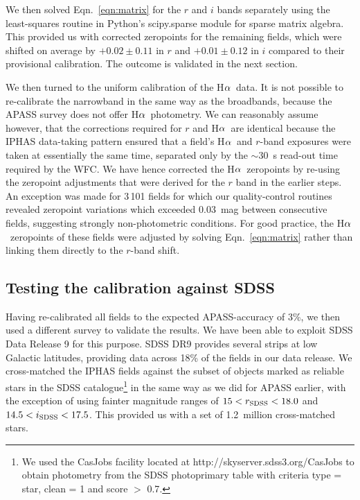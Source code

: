 \documentclass[useAMS,usenatbib]{mn2e}
\def\ha{\mbox{H$\rm \alpha$}}
\begin{document}
We then solved Eqn.~\ref{eqn:matrix} for the $r$ and $i$ bands
separately using the least-squares routine 
in Python's {\sc scipy.sparse} module for sparse matrix algebra.
This provided us with corrected zeropoints for the remaining fields,
which were shifted on average by $+0.02\pm0.11$ in $r$ 
and $+0.01\pm0.12$ in $i$ compared to their provisional calibration.
The outcome is validated in the next section.

We then turned to the uniform calibration of the \ha\ data.
It is not possible to re-calibrate the narrowband 
in the same way as the broadbands,
because the APASS survey does not offer \ha\ photometry.
We can reasonably assume however,
that the corrections required for $r$ and \ha\ are identical
because the IPHAS data-taking pattern ensured 
that a field's \ha\ and $r$-band exposures
were taken at essentially the same time, 
separated only by the $\sim$30~s read-out time required by the WFC.
We have hence corrected the \ha\ zeropoints 
by re-using the zeropoint adjustments that were derived for the $r$ band
in the earlier steps.
An exception was made for 3\,101 fields
for which our quality-control routines revealed
zeropoint variations which exceeded 0.03~mag 
between consecutive fields,
suggesting strongly non-photometric conditions.
For good practice, the \ha\ zeropoints of these fields
were adjusted by solving Eqn.~\ref{eqn:matrix}
rather than linking them directly to the $r$-band shift.

\subsection{Testing the calibration against SDSS}

Having re-calibrated all fields to the expected APASS-accuracy of 3\%,
we then used a different survey to validate the results.
We have been able to exploit SDSS Data Release 9 \citep{Ahn2012}
for this purpose.
SDSS DR9 provides several strips at low
Galactic latitudes,
providing data across 18\% of the fields in our data release.
We cross-matched the IPHAS fields against the subset of
objects marked as reliable stars in the SDSS catalogue\footnote{
We used the CasJobs facility located at http://skyserver.sdss3.org/CasJobs
to obtain photometry from the SDSS {\sc photoprimary} table 
with criteria {\sc type = star}, {\sc clean = 1} and {\sc score $>$ 0.7}.}
in the same way as we did for APASS earlier,
with the exception of using fainter magnitude ranges of 
$15<r_{\rm SDSS}<18.0$ and $14.5<i_{\rm SDSS}<17.5$.
This provided us with a set of 1.2~million cross-matched stars.
\end{document}
